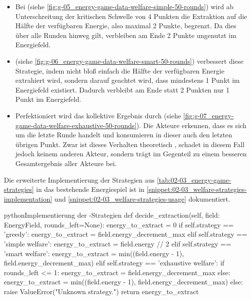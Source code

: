 \begin{itemize}
    \item Bei  (siehe \autoref{fig:g-05_energy-game-data-welfare-simple-50-rounds}) wird ab Unterschreitung der kritischen Schwelle von 4 Punkten die Extraktion auf die Hälfte der verfügbaren Energie, also maximal 2 Punkte, begrenzt. Da dies über alle Runden hinweg gilt, verbleiben am Ende 2 Punkte ungenutzt im Energiefeld.
    \item {} (siehe \autoref{fig:g-06_energy-game-data-welfare-smart-50-rounds}) verbessert diese Strategie, indem nicht bloß einfach die Hälfte der verfügbaren Energie extrahiert wird, sondern darauf geachtet wird, dass mindestens 1 Punkt im Energiefeld existiert. Dadurch verbleibt am Ende statt 2 Punkten nur 1 Punkt im Energiefeld.
    \item Perfektioniert wird das kollektive Ergebnis durch  (siehe \autoref{fig:g-07_energy-game-data-welfare-exhaustive-50-rounds}). Die Akteure erkennen, dass es sich um die letzte Runde handelt und konsumieren in dieser auch den letzten übrigen Punkt. Zwar ist dieses Verhalten theoretisch , schadet in diesem Fall jedoch keinem anderen Akteur, sondern trägt im Gegenteil zu einem besseren Gesamtergebnis aller Akteure bei.
\end{itemize}

Die erweiterte Implementierung der Strategien aus \autoref{tab:02-03_energy-game-strategies} in das bestehende Energiespiel ist in \autoref{snippet:02-03_welfare-strategies-implementation} und \autoref{snippet:02-03_welfare-strategies-usage} dokumentiert.

\begin{snippet}[htb]
    \centering
    \begin{codebox}{python}{Implementierung der -Strategien}
        def decide_extraction(self, field: EnergyField, rounds_left=None):
            energy_to_extract = 0
            if self.strategy == 'greedy':
                energy_to_extract = field.energy_decrement_max
            elif self.strategy == 'simple welfare':
                energy_to_extract = field.energy // 2
            elif self.strategy == 'smart welfare':
                energy_to_extract = min((field.energy - 1), field.energy_decrement_max)
            elif self.strategy == 'exhaustive welfare':
                if rounds_left <= 1:
                    energy_to_extract = field.energy_decrement_max
                else:
                    energy_to_extract = min((field.energy - 1), field.energy_decrement_max)
            else:
                raise ValueError("Unknown strategy.")
            return energy_to_extract
    \end{codebox}
    \caption{Implementierung der -Strategien}
    \label{snippet:02-03_welfare-strategies-implementation}
\end{snippet}

